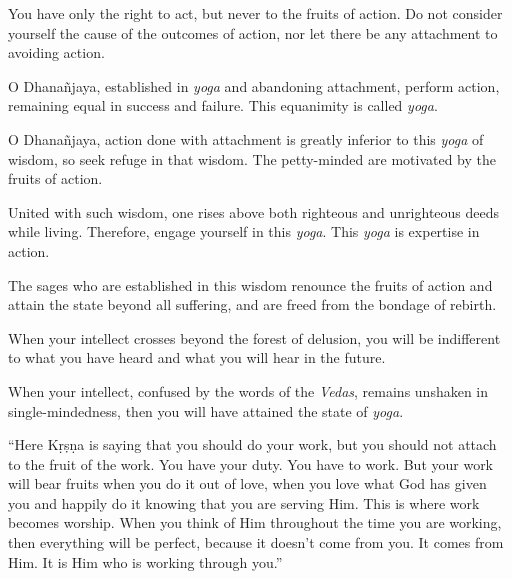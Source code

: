 {You have only the right to act, but never to the fruits of action. Do not consider yourself the cause of the outcomes of action, nor let there be any attachment to avoiding action.}

{O Dhanañjaya, established in \textit{yoga} and abandoning attachment, perform action, remaining equal in success and failure. This equanimity is called \textit{yoga}.}

{O Dhanañjaya, action done with attachment is greatly inferior to this \textit{yoga} of wisdom, so seek refuge in that wisdom. The petty-minded are motivated by the fruits of action.}

{United with such wisdom, one rises above both righteous and unrighteous deeds while living. Therefore, engage yourself in this \textit{yoga}. This \textit{yoga} is expertise in action.}

{The sages who are established in this wisdom renounce the fruits of action and attain the state beyond all suffering, and are freed from the bondage of rebirth.}

{When your intellect crosses beyond the forest of delusion, you will be indifferent to what you have heard and what you will hear in the future.}

{When your intellect, confused by the words of the \textit{Vedas}, remains unshaken in single-mindedness, then you will have attained the state of \textit{yoga}.}

\enquote{Here Kṛṣṇa is saying that you should do your work, but you should not attach to the fruit of the work. You have your duty. You have to work. But your work will bear fruits when you do it out of love, when you love what God has given you and happily do it knowing that you are serving Him. This is where work becomes worship. When you think of Him throughout the time you are working, then everything will be perfect, because it doesn’t come from you. It comes from Him. It is Him who is working through you.}

